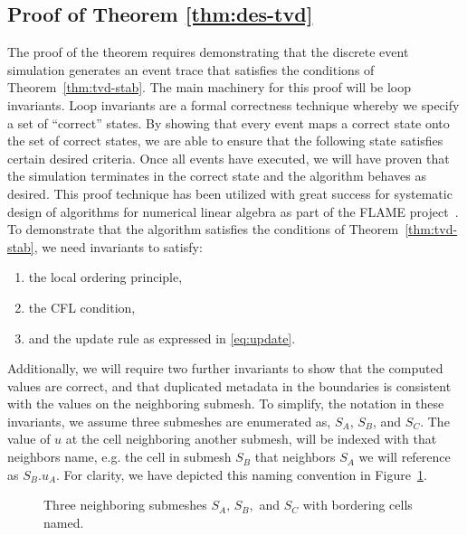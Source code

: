 \subsection{Proof of Theorem \ref{thm:des-tvd}}
The proof of the theorem requires demonstrating that the discrete event simulation generates an event trace that satisfies the conditions of Theorem~\ref{thm:tvd-stab}. The main machinery for this proof will be loop invariants. Loop invariants are a formal correctness technique whereby we specify a set of ``correct'' states. By showing that every event maps a correct state onto the set of correct states, we are able to ensure that the following state satisfies certain desired criteria. Once all events have executed, we will have proven that the simulation terminates in the correct state and the algorithm behaves as desired. This proof technique has been utilized with great success for systematic design of algorithms for numerical linear algebra as part of the FLAME project~\cite{Bientinesi2011, Myers2018}.
 To demonstrate that the algorithm satisfies the conditions of Theorem~\ref{thm:tvd-stab}, we need invariants to satisfy:
\begin{enumerate}
\item the local ordering principle,
\item the CFL condition,
\item and the update rule as expressed in \eqref{eq:update}.
\end{enumerate}
Additionally, we will require two further invariants to show that the computed values are correct, and that duplicated metadata in the boundaries is consistent with the values on the neighboring submesh. To simplify, the notation in these invariants, we assume three submeshes are enumerated as, $S_A$, $S_B$, and $S_C$. The value of $u$ at the cell neighboring another submesh, will be indexed with that neighbors name, e.g. the cell in submesh $S_B$ that neighbors $S_A$ we will reference as $S_B.u_A$. For clarity, we have depicted this naming convention in Figure~\ref{fig:submeshes}.
\begin{figure}
\centering
\caption{Three neighboring submeshes $S_A,\,S_B,$ and $S_C$ with bordering cells named.}
\label{fig:submeshes}
\end{figure}


